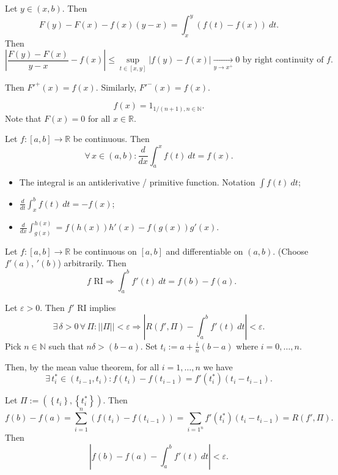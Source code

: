 \documentclass{notes}
\begin{document}
\begin{prf}
  Let $y \in (x, b)$.
  Then 
  \[
    F(y) - F(x) - f(x) (y - x) = \int_x^y (f(t) - f(x))\ dt.
  \]
  Then 
  \[
    \left | \frac{F(y) - F(x)}{y - x} - f(x) \right | \leq \sup_{t \in [x, y]} \left | f(y) - f(x) \right | \underset{y \to x^+}{\longrightarrow} 0 \text{ by right continuity of $f$}.
  \]
  
  Then $F'^+(x) = f(x)$.
  Similarly, $F'^-(x) = f(x)$.
\end{prf}

\begin{eg}
  \[
    f(x) = 1_{1 / (n + 1), n \in \mathbb N}.
  \]
  Note that $F(x) = 0$ for all $x \in \mathbb R$.
\end{eg}

\begin{cor}
  Let $f \colon [a, b] \to \mathbb R$ be continuous.
  Then 
  \[
    \forall \, x \in (a, b): \frac{d}{dx} \int_a^x f(t)\ dt = f(x).
  \]
\end{cor}

\begin{note}
  \begin{itemize}
    \item The integral is an antiderivative / primitive function.
    Notation $\int f(t)\ dt$; 

    \item $\frac{d}{dt} \int_x^b f(t)\ dt = - f(x)$; 
    
    \item $\frac{d}{dx} \int_{g(x)}^{h(x)} = f(h(x)) h'(x) - f(g(x)) g'(x)$.
  \end{itemize}
\end{note}

\begin{thm}
  Let $f \colon [a, b]\to \mathbb R$ be continuous on $[a, b]$ and differentiable on $(a, b)$.
  (Choose $f'(a)$, $'(b)$) arbitrarily.
  Then 
  \[
    \text{ $f$ RI} \Rightarrow \int_a^b f'(t)\ dt = f(b) - f(a).
  \]
\end{thm}

\begin{prf}
  Let $\varepsilon > 0$.
  Then $f'$ RI implies 
  \[
    \exists \, \delta > 0 \, \forall \, \Pi: ||\Pi|| < \varepsilon \Rightarrow \left | R(f', \Pi) - \int_a^b f'(t)\ dt \right | < \varepsilon.
  \]
  Pick $n \in \mathbb N$ such that $n \delta > (b - a)$.
  Set $t_i := a + \frac{i}{n} (b - a)$ where $i = 0, \dots, n$.

  Then, by the mean value theorem, for all $i = 1, \dots, n$ we have 
  \[
    \exists \, t_i^* \in (t_{i - 1}, t_i): f(t_i) - f(t_{i - 1}) = f'(t_i^*) (t_i - t_{i - 1}).
  \]
  
  Let $\Pi := (\left \{ t_i \right \}, \left \{ t_i^* \right \})$.
  Then 
  \[
    f(b) - f(a) = \sum_{i = 1}^n (f(t_i) - f(t_{i - 1})) = \sum_{i = 1^n} f'(t_i^*) (t_i - t_{i - 1}) = R(f', \Pi).
  \]
  Then 
  \[
    \left | f(b) - f(a) - \int_a^b f'(t)\ dt \right | < \varepsilon.
  \]
\end{prf}
\end{document}
